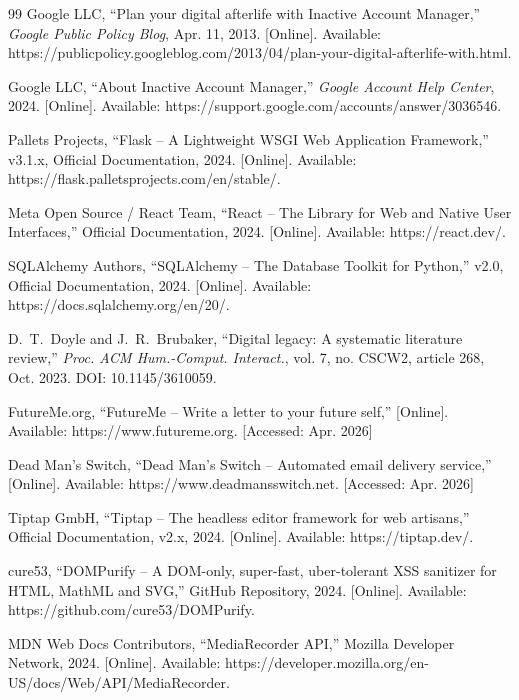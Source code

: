 \documentclass[12pt, a4paper]{article}
\begin{document}
\begin{thebibliography}{99}
Google LLC, ``Plan your digital afterlife with Inactive Account Manager,'' \textit{Google Public Policy Blog}, Apr. 11, 2013. [Online]. Available: https://publicpolicy.googleblog.com/2013/04/plan-your-digital-afterlife-with.html.

Google LLC, ``About Inactive Account Manager,'' \textit{Google Account Help Center}, 2024. [Online]. Available: https://support.google.com/accounts/answer/3036546.

Pallets Projects, ``Flask -- A Lightweight WSGI Web Application Framework,'' v3.1.x, Official Documentation, 2024. [Online]. Available: https://flask.palletsprojects.com/en/stable/.

Meta Open Source / React Team, ``React -- The Library for Web and Native User Interfaces,'' Official Documentation, 2024. [Online]. Available: https://react.dev/.

SQLAlchemy Authors, ``SQLAlchemy -- The Database Toolkit for Python,'' v2.0, Official Documentation, 2024. [Online]. Available: https://docs.sqlalchemy.org/en/20/.

D.~T.~Doyle and J.~R.~Brubaker, ``Digital legacy: A systematic literature review,'' \textit{Proc. ACM Hum.-Comput. Interact.}, vol. 7, no. CSCW2, article 268, Oct. 2023. DOI: 10.1145/3610059.

FutureMe.org, ``FutureMe -- Write a letter to your future self,'' [Online]. Available: https://www.futureme.org. [Accessed: Apr. 2026]

Dead Man's Switch, ``Dead Man's Switch -- Automated email delivery service,'' [Online]. Available: https://www.deadmansswitch.net. [Accessed: Apr. 2026]

Tiptap GmbH, ``Tiptap -- The headless editor framework for web artisans,'' Official Documentation, v2.x, 2024. [Online]. Available: https://tiptap.dev/.

cure53, ``DOMPurify -- A DOM-only, super-fast, uber-tolerant XSS sanitizer for HTML, MathML and SVG,'' GitHub Repository, 2024. [Online]. Available: https://github.com/cure53/DOMPurify.

MDN Web Docs Contributors, ``MediaRecorder API,'' Mozilla Developer Network, 2024. [Online]. Available: https://developer.mozilla.org/en-US/docs/Web/API/MediaRecorder.

\end{thebibliography}
\end{document}
